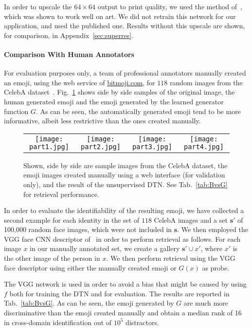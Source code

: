 \documentclass{article} \usepackage{iclr2017_conference,times}
\begin{document}
In order to upscale the $64 \times 64$ output to print quality, we used the method of~\cite{superres}, which was shown to work well on art. We did not retrain this network for our application, and used the published one. Results without this upscale are shown, for comparison, in Appendix~\ref{sec:superres}. 

\paragraph{Comparison With Human Annotators}For evaluation purposes only, a team of professional annotators manually created an emoji, using the web service of \url{bitmoji.com}, for $118$ random images from the CelebA dataset~\citep{celeba}.  Fig.~\ref{fig:IBtagB} shows side by side samples of the original image, the human generated emoji and the emoji generated by the learned generator function $G$.  As can be seen, the automatically generated emoji tend to be more informative, albeit less restrictive than the ones created manually. 

\begin{figure}[t]
\centering
\begin{tabular}{cccc}
\texttt{[image: part1.jpg]}&
\texttt{[image: part2.jpg]}&
\texttt{[image: part3.jpg]}&
\texttt{[image: part4.jpg]}
\end{tabular}
\caption{\label{fig:IBtagB} Shown, side by side are sample images from the CelebA dataset, the emoji images created manually using a web interface (for validation only), and the result of the unsupervised DTN. See Tab.~\ref{tab:BvsG} for retrieval performance.}
\end{figure}

In order to evaluate the identifiability of the resulting emoji, we have collected a second example for each identity in the set of $118$ CelebA images and a set $\mathbf s'$ of 100,000 random face images, which were not included in $\mathbf s$. We then employed the VGG face CNN descriptor of~\cite{Parkhi15} in order to perform retrieval as follows. For each image $x$ in our manually annotated set, we create a gallery  $\mathbf s' \cup x'$, where $x'$ is the other image of the person in $x$. We then perform retrieval using the VGG face descriptor using either the manually created emoji or $G(x)$ as probe. 

The VGG network is used in order to avoid a bias that might be caused by using $f$ both for training the DTN and for evaluation. The results are reported in Tab.~\ref{tab:BvsG}. As can be seen, the emoji generated by $G$ are much more discriminative than the emoji created manually and obtain a median rank of 16 in cross-domain identification out of $10^5$ distractors.
\end{document}
